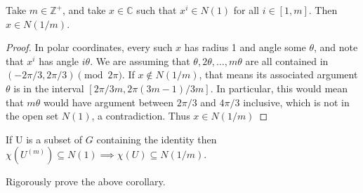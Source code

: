 \documentclass[11pt, x11names]{book}
\newcommand{\zz}{\mathbb{Z}}
\newcommand{\cc}{\mathbb{C}}
\begin{document}
\begin{lemma}
\label{compact-open key lemma}
Take $m \in \zz^+$, and take $x \in \cc$ such that $x^i \in N(1)$ for all $i \in [1, m]$.
Then $x \in N(1/m)$.
\end{lemma}
\begin{proof}
In polar coordinates, every such $x$ has radius 1 and angle some $\theta$, and note that $x^i$
has angle $i \theta$. We are assuming that $\theta, 2 \theta, \ldots, m\theta$ are all 
contained in $(-2\pi/3, 2\pi/3) \pmod{2\pi}$. If $x \notin N(1/m)$, that means its associated
argument $\theta$ is in the interval $[2\pi/3m, 2\pi (3m - 1)/3m]$. In particular, this would mean that $m \theta$ would have argument between $2 \pi / 3$ and $4\pi/3$ inclusive, which is not in the open set $N(1)$, a contradiction. Thus $x \in N(1/m)$
\end{proof}
\begin{corollary}
\label{compact-open key corollary}
    If U is a subset of $G$ containing the identity then $\chi(U^{(m)}) \subseteq N(1) \implies \chi(U) \subseteq N(1/m)$. 
\end{corollary}

\begin{exercise}
Rigorously prove the above corollary.
\end{exercise}
\end{document}
